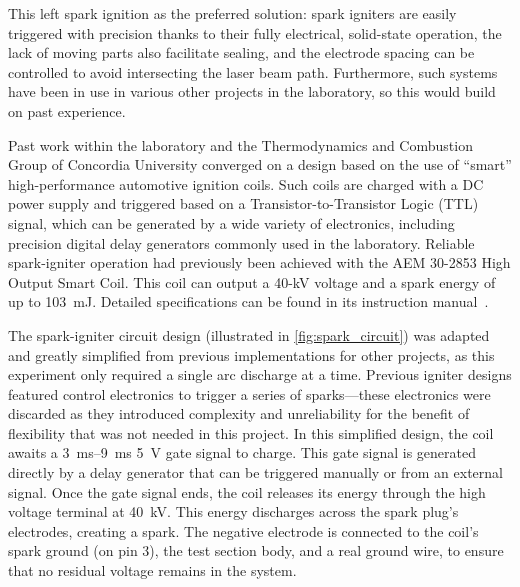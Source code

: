             This left spark ignition as the preferred solution: spark igniters are easily triggered with precision thanks to their fully electrical, solid-state operation, the lack of moving parts also facilitate sealing, and the electrode spacing can be controlled to avoid intersecting the laser beam path. Furthermore, such systems have been in use in various other projects in the laboratory, so this would build on past experience.

            Past work within the laboratory and the Thermodynamics and Combustion Group of Concordia University converged on a design based on the use of ``smart'' high-performance automotive ignition coils. Such coils are charged with a DC power supply and triggered based on a Transistor-to-Transistor Logic (TTL) signal, which can be generated by a wide variety of electronics, including precision digital delay generators commonly used in the laboratory. Reliable spark-igniter operation had previously been achieved with the AEM 30-2853 High Output Smart Coil. This coil can output a \num{40}-\unit{kV} voltage and a spark energy of up to \qty{103}{mJ}. Detailed specifications can be found in its instruction manual~\cite{aemperformanceelectronicsInstructionManual302853}.
            
            The spark-igniter circuit design (illustrated in \autoref{fig:spark_circuit}) was adapted and greatly simplified from previous implementations for other projects, as this experiment only required a single arc discharge at a time. Previous igniter designs featured control electronics to trigger a series of sparks---these electronics were discarded as they introduced complexity and unreliability for the benefit of flexibility that was not needed in this project. In this simplified design, the coil awaits a \qtyrange{3}{9}{ms} 5~V gate signal to charge. This gate signal is generated directly by a delay generator that can be triggered manually or from an external signal. Once the gate signal ends, the coil releases its energy through the high voltage terminal at \qty{40}{kV}. This energy discharges across the spark plug's electrodes, creating a spark. The negative electrode is connected to the coil's spark ground (on pin 3), the test section body, and a real ground wire, to ensure that no residual voltage remains in the system.

